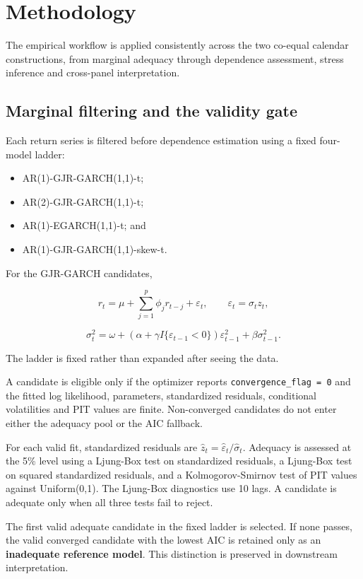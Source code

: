\section{Methodology}
\label{sec:methodology}


The empirical workflow is applied consistently across the two co-equal calendar constructions, from marginal adequacy through dependence assessment, stress inference and cross-panel interpretation.

\subsection{Marginal filtering and the validity gate}

Each return series is filtered before dependence estimation using a fixed four-model ladder:
\begin{itemize}
\item AR(1)-GJR-GARCH(1,1)-t;
\item AR(2)-GJR-GARCH(1,1)-t;
\item AR(1)-EGARCH(1,1)-t; and
\item AR(1)-GJR-GARCH(1,1)-skew-t.
\end{itemize}
For the GJR-GARCH candidates,

\[
r_t=\mu+\sum_{j=1}^{p}\phi_j r_{t-j}+\varepsilon_t,\qquad
\varepsilon_t=\sigma_t z_t,
\]

\[
\sigma_t^2=\omega+\left(\alpha+\gamma I\{\varepsilon_{t-1}<0\}\right)\varepsilon_{t-1}^2+\beta\sigma_{t-1}^2.
\]

The ladder is fixed rather than expanded after seeing the data.

A candidate is eligible only if the optimizer reports \texttt{convergence\_flag = 0} and the fitted log likelihood, parameters, standardized residuals, conditional volatilities and PIT values are finite. Non-converged candidates do not enter either the adequacy pool or the AIC fallback.

For each valid fit, standardized residuals are \(\hat z_t=\hat\varepsilon_t/\hat\sigma_t\). Adequacy is assessed at the 5\% level using a Ljung-Box test on standardized residuals, a Ljung-Box test on squared standardized residuals, and a Kolmogorov-Smirnov test of PIT values against Uniform(0,1). The Ljung-Box diagnostics use 10 lags. A candidate is adequate only when all three tests fail to reject.

The first valid adequate candidate in the fixed ladder is selected. If none passes, the valid converged candidate with the lowest AIC is retained only as an \textbf{inadequate reference model}. This distinction is preserved in downstream interpretation.

